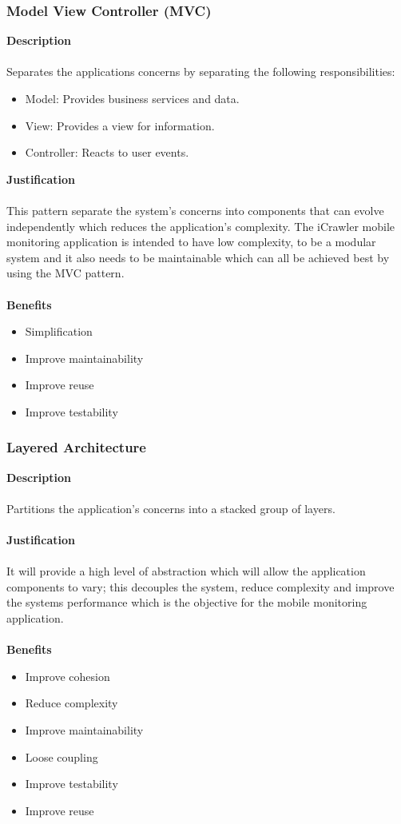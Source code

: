 \documentclass[hidelinks, 12pt, oneside]{article}
\begin{document}
    \subsubsection*{Model View Controller (MVC)}
    \textbf{Description}\\\\
    Separates the applications concerns by separating the following responsibilities:
    \begin{itemize}
    \item Model: Provides business services and data.
    \item View: Provides a view for information.
    \item Controller: Reacts to user events. 
    \end{itemize}
    \textbf{Justification}\\\\
    This pattern separate the system's concerns into components that can evolve independently which reduces the application's complexity. The iCrawler mobile monitoring application is intended to have low complexity, to be a modular system and it also needs to be maintainable which can all be achieved best by using the MVC pattern. \\\\
    \textbf{Benefits}
    \begin{itemize}
    \item Simplification
    \item Improve maintainability
    \item Improve reuse
    \item Improve testability 
	\end{itemize} 
	
	\newpage
	\subsubsection{Layered Architecture}
	\textbf{Description}\\\\
	Partitions the application's concerns into a stacked group of layers.\\\\
	\textbf{Justification}\\\\
	It will provide a high level of abstraction which will allow the application components to vary; this decouples the system, reduce complexity and improve the systems performance which is the objective for the mobile monitoring application.\\\\
	\textbf{Benefits}
	\begin{itemize}
	\item Improve cohesion
	\item Reduce complexity
	\item Improve maintainability
	\item Loose coupling
	\item Improve testability
	\item Improve reuse
	\end{itemize}
	\newpage
\end{document}
